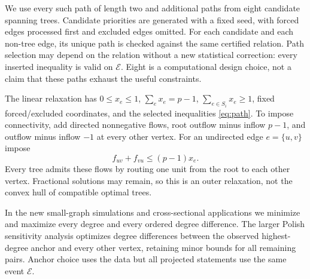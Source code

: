 \documentclass[11pt]{article}
\theoremstyle{plain}
\theoremstyle{definition}\newtheorem{remark}{Remark}\newtheorem{example}{Example}
\begin{document}
We use every such path of length two and additional paths from eight candidate spanning trees. Candidate priorities are generated with a fixed seed, with forced edges processed first and excluded edges omitted. For each candidate and each non-tree edge, its unique path is checked against the same certified relation. Path selection may depend on the relation without a new statistical correction: every inserted inequality is valid on $\mathcal E$. Eight is a computational design choice, not a claim that these paths exhaust the useful constraints.

The linear relaxation has $0\le x_e\le1$, $\sum_e x_e=p-1$, $\sum_{e\in S_i}x_e\ge1$, fixed forced/excluded coordinates, and the selected inequalities \eqref{eq:path}. To impose connectivity, add directed nonnegative flows, root outflow minus inflow $p-1$, and outflow minus inflow $-1$ at every other vertex. For an undirected edge $e=\{u,v\}$ impose
\[
 f_{uv}+f_{vu}\le(p-1)x_e.
\]
Every tree admits these flows by routing one unit from the root to each other vertex. Fractional solutions may remain, so this is an outer relaxation, not the convex hull of compatible optimal trees.

In the new small-graph simulations and cross-sectional applications we minimize and maximize every degree and every ordered degree difference. The larger Polish sensitivity analysis optimizes degree differences between the observed highest-degree anchor and every other vertex, retaining minor bounds for all remaining pairs. Anchor choice uses the data but all projected statements use the same event $\mathcal E$.
\end{document}
